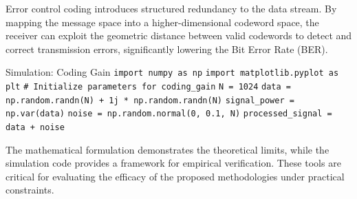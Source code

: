 Error control coding introduces structured redundancy to the data stream. By mapping the message space into a higher-dimensional codeword space, the receiver can exploit the geometric distance between valid codewords to detect and correct transmission errors, significantly lowering the Bit Error Rate (BER).

\begin{pythonbox}{Simulation: Coding Gain}
\texttt{import numpy as np}
\texttt{import matplotlib.pyplot as plt}
\texttt{}
\texttt{\# Initialize parameters for coding\_gain}
\texttt{N = 1024}
\texttt{data = np.random.randn(N) + 1j * np.random.randn(N)}
\texttt{signal\_power = np.var(data)}
\texttt{noise = np.random.normal(0, 0.1, N)}
\texttt{processed\_signal = data + noise}
\end{pythonbox}

\vspace{0.5cm}
The mathematical formulation demonstrates the theoretical limits, while the simulation code provides a framework for empirical verification. These tools are critical for evaluating the efficacy of the proposed methodologies under practical constraints.

